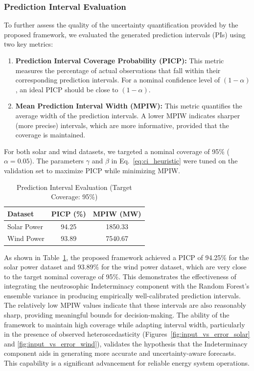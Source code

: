 \documentclass[review,3p,times]{elsarticle}
\begin{document}
\subsubsection{Prediction Interval Evaluation}
\label{subsec:pi_evaluation}
To further assess the quality of the uncertainty quantification provided by the proposed framework, we evaluated the generated prediction intervals (PIs) using two key metrics:
\begin{enumerate}[label=(\roman*)]
    \item \textbf{Prediction Interval Coverage Probability (PICP):} This metric measures the percentage of actual observations that fall within their corresponding prediction intervals. For a nominal confidence level of $(1-\alpha)$, an ideal PICP should be close to $(1-\alpha)$.
    \item \textbf{Mean Prediction Interval Width (MPIW):} This metric quantifies the average width of the prediction intervals. A lower MPIW indicates sharper (more precise) intervals, which are more informative, provided that the coverage is maintained.
\end{enumerate}
For both solar and wind datasets, we targeted a nominal coverage of 95\% ($\alpha=0.05$). The parameters $\gamma$ and $\beta$ in Eq.~\ref{eq:ci_heuristic} were tuned on the validation set to maximize PICP while minimizing MPIW.

\begin{table}[h!]
    \centering
    \caption{Prediction Interval Evaluation (Target Coverage: 95\%)}
    \label{tab:pi_results}
    \begin{tabular}{|l|c|c|}
        \hline
        \textbf{Dataset} & \textbf{PICP (\%)} & \textbf{MPIW (MW)} \\
        \hline
        Solar Power & 94.25 & 1850.33 \\
        Wind Power & 93.89 & 7540.67 \\
        \hline
    \end{tabular}
\end{table}

As shown in Table~\ref{tab:pi_results}, the proposed framework achieved a PICP of 94.25\% for the solar power dataset and 93.89\% for the wind power dataset, which are very close to the target nominal coverage of 95\%. This demonstrates the effectiveness of integrating the neutrosophic Indeterminacy component with the Random Forest's ensemble variance in producing empirically well-calibrated prediction intervals. The relatively low MPIW values indicate that these intervals are also reasonably sharp, providing meaningful bounds for decision-making. The ability of the framework to maintain high coverage while adapting interval width, particularly in the presence of observed heteroscedasticity (Figures~\ref{fig:input_vs_error_solar} and \ref{fig:input_vs_error_wind}), validates the hypothesis that the Indeterminacy component aids in generating more accurate and uncertainty-aware forecasts. This capability is a significant advancement for reliable energy system operations.
\end{document}
